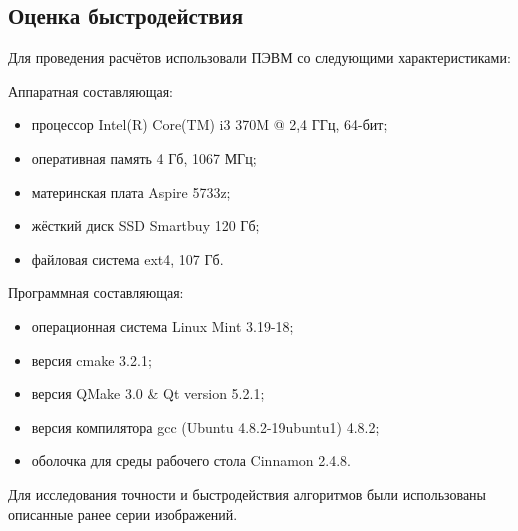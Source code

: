 \subsection {Оценка быстродействия}
Для проведения расчётов использовали ПЭВМ со следующими характеристиками:

Аппаратная составляющая:
\begin{itemize}
\item процессор Intel(R) Core(TM) i3 370M @ 2,4 ГГц, 64-бит;
\item оперативная память 4 Гб, 1067 МГц;
\item материнская плата Aspire 5733z;
\item жёсткий диск SSD Smartbuy 120 Гб;
\item файловая система ext4, 107 Гб.
\end{itemize}

Программная составляющая:
\begin{itemize}
\item операционная система Linux Mint 3.19-18;
\item версия cmake 3.2.1;
\item версия QMake 3.0 \& Qt version 5.2.1;
\item версия компилятора gcc (Ubuntu 4.8.2-19ubuntu1) 4.8.2;
\item оболочка для среды рабочего стола Cinnamon 2.4.8.
\end{itemize}

Для исследования точности и быстродействия  алгоритмов были использованы описанные ранее серии изображений.